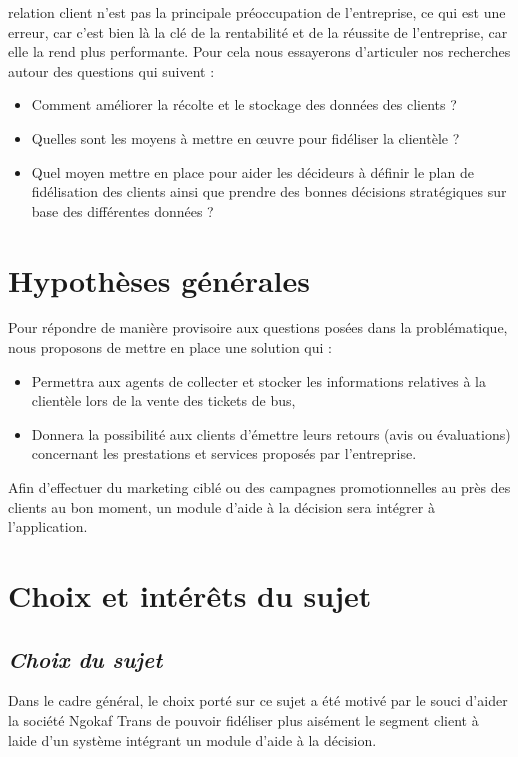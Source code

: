     relation client n’est pas la principale préoccupation de l’entreprise, ce qui est
    une erreur, car c’est bien là la clé de la rentabilité et de la réussite de l’entreprise,
    car elle la rend plus performante. Pour cela nous essayerons d’articuler nos recherches
    autour des questions qui suivent :
    \par
        \begin{itemize}
            \setlength{\itemsep}{0pt}
            \item [\ding{226}] Comment améliorer la récolte et le stockage des
            données des clients ?
            \item [\ding{226}] Quelles sont les moyens à mettre en œuvre pour fidéliser la clientèle ?
            \item [\ding{226}] Quel moyen mettre en place pour aider les décideurs à définir le plan
            de fidélisation des clients ainsi que prendre des bonnes décisions stratégiques
            sur base des différentes données ?
        \end{itemize}
    \section[Hypothèses générales]{Hypothèses générales}
    Pour répondre de manière provisoire aux questions posées dans la problématique,
    nous proposons de mettre en place une solution qui :
    \par
        \begin{itemize}
            \setlength{\itemsep}{0pt}
            \item [\ding{226}] Permettra aux agents de collecter
            et stocker les informations relatives à la clientèle lors de la vente
            des tickets de bus,
            \item [\ding{226}] Donnera la possibilité 
            aux clients d’émettre leurs retours (avis ou évaluations) concernant les prestations et services
            proposés par l’entreprise.
        \end{itemize}
    Afin d’effectuer du marketing ciblé ou des campagnes
    promotionnelles au près des clients au bon moment,
    un module d’aide à la décision sera intégrer à l’application.
    \section[Choix et interet du sujet]{Choix et intérêts du sujet}
        \subsection[Choix du sujet]{\textit{Choix du sujet}}
        Dans le cadre général, le choix porté sur ce sujet a été motivé par le souci d’aider
        la société Ngokaf Trans de pouvoir fidéliser plus aisément le segment client à laide d’un
        système intégrant un module d’aide à la décision.

